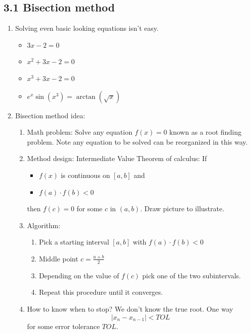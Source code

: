 \documentclass{article}
\newcommand{\ds}{\displaystyle}
\theoremstyle{remark}
\begin{document}
\subsection{3.1 Bisection method}

\begin{enumerate}
\item Solving even basic looking equations isn't easy.
\begin{itemize}
\item $\ds 3x-2=0$
\item $\ds x^2+3x-2=0$
\item $\ds x^3+3x-2=0$
\item $\ds e^x\sin(x^3)=\arctan(\sqrt{x})$
\end{itemize}

\item Bisection method idea:
\begin{enumerate}

\item Math problem: Solve any equation $f(x)=0$ known as a root finding problem. Note any equation to be solved can be reorganized in this way.

\item Method design: Intermediate Value Theorem of calculus: If 
\begin{itemize}
\item $f(x)$ is continuous on $[a,b]$ and
\item $f(a) \cdot f(b) < 0$
\end{itemize}
then $f(c)=0$ for some $c$ in $(a,b)$. Draw picture to illustrate.
\item Algorithm: 
\begin{enumerate}
\item Pick a starting interval $[a,b]$ with $f(a)\cdot f(b)<0$
\item Middle point $c = \frac{a+b}{2}$
\item Depending on the value of $f(c)$ pick one of the two subintervals.
\item Repeat this procedure until it converges.
\end{enumerate}
\item How to know when to stop? We don't know the true root. One way
\[
|x_n - x_{n-1}| < TOL
\]
for some error tolerance $TOL$.
\end{enumerate}
 

\end{enumerate}
\end{document}
